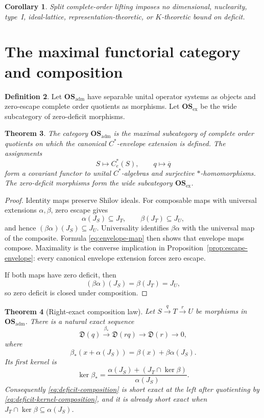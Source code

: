 \documentclass[11pt,a4paper]{amsart}
\theoremstyle{plain}
\newtheorem{theorem}{Theorem}[section]
\newtheorem{corollary}[theorem]{Corollary}
\theoremstyle{definition}
\newtheorem{definition}[theorem]{Definition}
\newcommand{\Ce}{C_e^*}
\newcommand{\OSadm}{\mathbf{OS}_{\mathrm{adm}}}
\newcommand{\OSex}{\mathbf{OS}_{\mathrm{ex}}}
\newcommand{\Def}{\mathfrak D}
\begin{document}
\begin{corollary}\label{cor:deficit-unbounded}
Split complete-order lifting imposes no dimensional, nuclearity, type~I, ideal-lattice,
representation-theoretic, or $K$-theoretic bound on deficit.
\end{corollary}

\section{The maximal functorial category and composition}\label{sec:composition}

\begin{definition}\label{def:admissible}
Let $\OSadm$ have separable unital operator systems as objects and zero-escape complete order
quotients as morphisms.  Let $\OSex$ be the wide subcategory of zero-deficit morphisms.
\end{definition}

\begin{theorem}\label{thm:maximal-category}
The category $\OSadm$ is the maximal subcategory of complete order quotients on which the
canonical $C^*$-envelope extension is defined.  The assignments
\[
 S\longmapsto\Ce(S),\qquad q\longmapsto\overline q
\]
form a covariant functor to unital $C^*$-algebras and surjective $*$-homomorphisms.
The zero-deficit morphisms form the wide subcategory $\OSex$.
\end{theorem}

\begin{proof}
Identity maps preserve Shilov ideals.  For composable maps with universal extensions
$\alpha,\beta$, zero escape gives
\[
 \alpha(J_S)\subseteq J_T,\qquad \beta(J_T)\subseteq J_U,
\]
and hence $(\beta\alpha)(J_S)\subseteq J_U$.  Universality identifies $\beta\alpha$ with the
universal map of the composite.  Formula \eqref{eq:envelope-map} then shows that envelope maps
compose.  Maximality is the converse implication in Proposition~\ref{prop:escape-envelope}: every
canonical envelope extension forces zero escape.

If both maps have zero deficit, then
\[
 (\beta\alpha)(J_S)=\beta(J_T)=J_U,
\]
so zero deficit is closed under composition.
\end{proof}

\begin{theorem}[Right-exact composition law]\label{thm:deficit-composition}
Let $S\xrightarrow{q}T\xrightarrow{r}U$ be morphisms in $\OSadm$.  There is a natural exact
sequence
\begin{equation}\label{eq:deficit-composition}
 \Def(q)\xrightarrow{\beta_*}\Def(rq)
 \longrightarrow\Def(r)\longrightarrow0,
\end{equation}
where
\[
 \beta_*(x+\alpha(J_S))=\beta(x)+\beta\alpha(J_S).
\]
Its first kernel is
\begin{equation}\label{eq:deficit-kernel-composition}
 \ker\beta_*=\frac{\alpha(J_S)+(J_T\cap\ker\beta)}{\alpha(J_S)}.
\end{equation}
Consequently \eqref{eq:deficit-composition} is short exact at the left after quotienting by
\eqref{eq:deficit-kernel-composition}, and it is already short exact when
$J_T\cap\ker\beta\subseteq\alpha(J_S)$.
\end{theorem}
\end{document}
